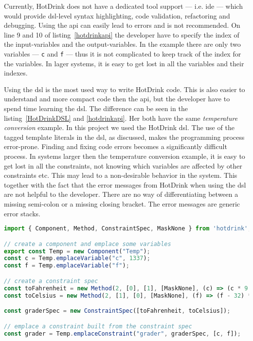 Currently, HotDrink does not have a dedicated tool support --- i.e. \gls{ide} --- which would provide \gls{dsl}-level syntax highlighting, code validation, refactoring and debugging. Using the \gls{api} can easily lead to errors and is not recommended. On line 9 and 10 of listing~\ref{hotdrinkapi} the developer have to specify the index of the input-variables and the output-variables. In the example there are only two variables --- \texttt{c} and \texttt{f} --- thus it is not complicated to keep track of the index for the variables. In lager systems, it is easy to get lost in all the variables and their indexes.

Using the \gls{dsl} is the most used way to write HotDrink code. This is also easier to understand and more compact code then the \gls{api}, but the developer have to spend time learning the \gls{dsl}. The difference can be  seen in the listing~\ref{HotDrinkDSL} and \ref{hotdrinkapi}. Her both have the same \textit{temperature conversion} example. In this project we used the HotDrink \gls{dsl}. The use of the tagged template literals in the \gls{dsl}, as discussed, makes the programming process error-prone. Finding and fixing code errors becomes a significantly difficult process. In systems larger then the temperature conversion example, it is easy to get lost in all the constraints, not knowing which variables are affected by other constraints etc. This may lead to a non-desirable behavior in the system. This together with the fact that the error messages from HotDrink when using the \gls{dsl} are not helpful to the developer. There are no way of differentiating between a missing semi-colon or a missing closing bracket. The error messages are generic error stacks. 

\begin{lstlisting}[caption={Example of how to use the HotDrink \gls{api} to simulate the relationship between fahrenheit and celsius.},label=hotdrinkapi, language=JavaScript]
import { Component, Method, ConstraintSpec, MaskNone } from 'hotdrink';

// create a component and emplace some variables
export const Temp = new Component("Temp");
const c = Temp.emplaceVariable("c", 1337);
const f = Temp.emplaceVariable("f");

// create a constraint spec
const toFahrenheit = new Method(2, [0], [1], [MaskNone], (c) => (c * 9 / 5 + 32));
const toCelsius = new Method(2, [1], [0], [MaskNone], (f) => (f - 32) * 5 / 9);

const graderSpec = new ConstraintSpec([toFahrenheit, toCelsius]);

// emplace a constraint built from the constraint spec
const grader = Temp.emplaceConstraint("grader", graderSpec, [c, f]);
\end{lstlisting}
